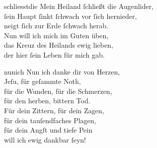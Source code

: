 \documentclass[tocstyle=ref-genre]{ees}
\begin{document}
{  \begin{movement}{schliesstdie}
    \voice[Tenore]
    Mein Heiland ſchließt die Augenlider,\\
    ſein Haupt ſinkt ſchwach vor ſich hernieder,\\
    neigt ſich zur Erde ſchwach herab.\\[1ex]
    Nun will ich mich im Guten üben,\\
    das Kreuz des Heilands ewig lieben,\\
    der hier ſein Leben für mich gab.
  \end{movement}

  \begin{movement}{nunich}
    \voice[Coro]
    Nun ich danke dir von Herzen,\\
    Jeſu, für geſammte Noth,\\
    für die Wunden, für die Schmerzen,\\
    für den herben, bittern Tod.\\
    Für dein Zittern, für dein Zagen,\\
    für dein tauſendfaches Plagen,\\
    für dein Angſt und tiefe Pein\\
    will ich ewig dankbar ſeyn!
  \end{movement}
}

\eesScore
\end{document}
